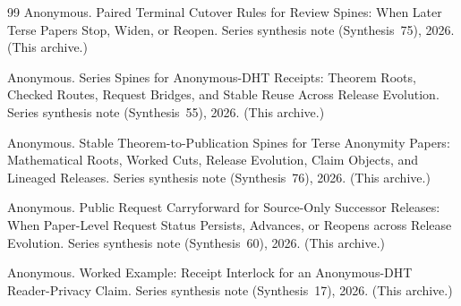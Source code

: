 \documentclass[11pt]{article}
\begin{document}
\begin{thebibliography}{99}
Anonymous.
\newblock Paired Terminal Cutover Rules for Review Spines: When Later Terse Papers Stop, Widen, or Reopen.
\newblock Series synthesis note (Synthesis~75), 2026. (This archive.)

Anonymous.
\newblock Series Spines for Anonymous-DHT Receipts: Theorem Roots, Checked Routes, Request Bridges, and Stable Reuse Across Release Evolution.
\newblock Series synthesis note (Synthesis~55), 2026. (This archive.)

Anonymous.
\newblock Stable Theorem-to-Publication Spines for Terse Anonymity Papers: Mathematical Roots, Worked Cuts, Release Evolution, Claim Objects, and Lineaged Releases.
\newblock Series synthesis note (Synthesis~76), 2026. (This archive.)

Anonymous.
\newblock Public Request Carryforward for Source-Only Successor Releases: When Paper-Level Request Status Persists, Advances, or Reopens across Release Evolution.
\newblock Series synthesis note (Synthesis~60), 2026. (This archive.)

Anonymous.
\newblock Worked Example: Receipt Interlock for an Anonymous-DHT Reader-Privacy Claim.
\newblock Series synthesis note (Synthesis~17), 2026. (This archive.)

\end{thebibliography}
\end{document}
